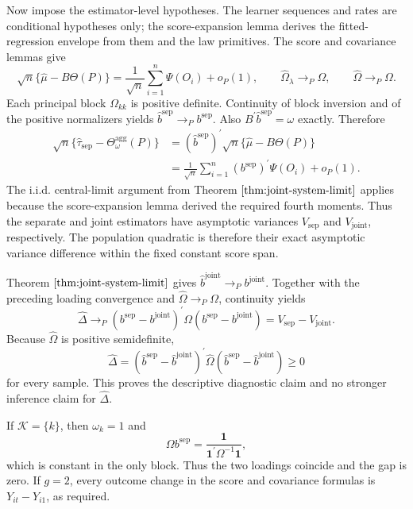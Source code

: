 Now impose the estimator-level hypotheses. The learner sequences and rates are conditional hypotheses only; the score-expansion lemma derives the fitted-regression envelope from them and the law primitives. The score and covariance lemmas give
\[
 \sqrt n\{\widehat\mu-B\Theta(P)\}
 =\frac1{\sqrt n}\sum_{i=1}^n\Psi(O_i)+o_P(1),
 \qquad
 \widehat\Omega_\lambda\to_P\Omega,
 \qquad
 \widehat\Omega\to_P\Omega.
\]
Each principal block \(\Omega_{kk}\) is positive definite. Continuity of block inversion and of the positive normalizers yields \(\widehat b^{\mathrm{sep}}\to_Pb^{\mathrm{sep}}\). Also \(B^{\prime}\widehat b^{\mathrm{sep}}=\omega\) exactly. Therefore
\[
\begin{aligned}
 \sqrt n\{\widehat\tau_{\mathrm{sep}}-\Theta_\omega^{\mathrm{agg}}(P)\}
 &=(\widehat b^{\mathrm{sep}})^{\prime}
   \sqrt n\{\widehat\mu-B\Theta(P)\}\\
 &=\frac1{\sqrt n}\sum_{i=1}^n
   (b^{\mathrm{sep}})^{\prime}\Psi(O_i)+o_P(1).
\end{aligned}
\]
The i.i.d. central-limit argument from Theorem \(\ref{thm:joint-system-limit}\) applies because the score-expansion lemma derived the required fourth moments. Thus the separate and joint estimators have asymptotic variances \(V_{\mathrm{sep}}\) and \(V_{\mathrm{joint}}\), respectively. The population quadratic is therefore their exact asymptotic variance difference within the fixed constant score span.

Theorem \(\ref{thm:joint-system-limit}\) gives \(\widehat b^{\mathrm{joint}}\to_Pb^{\mathrm{joint}}\). Together with the preceding loading convergence and \(\widehat\Omega\to_P\Omega\), continuity yields
\[
 \widehat\Delta
 \to_P
 (b^{\mathrm{sep}}-b^{\mathrm{joint}})^{\prime}
 \Omega(b^{\mathrm{sep}}-b^{\mathrm{joint}})
 =V_{\mathrm{sep}}-V_{\mathrm{joint}}.
\]
Because \(\widehat\Omega\) is positive semidefinite,
\[
 \widehat\Delta
 =(\widehat b^{\mathrm{sep}}-\widehat b^{\mathrm{joint}})^{\prime}
 \widehat\Omega
 (\widehat b^{\mathrm{sep}}-\widehat b^{\mathrm{joint}})\ge0
\]
for every sample. This proves the descriptive diagnostic claim and no stronger inference claim for \(\widehat\Delta\).

If \(\mathcal K=\{k\}\), then \(\omega_k=1\) and
\[
 \Omega b^{\mathrm{sep}}
 =\frac{\mathbf 1}{\mathbf 1^{\prime}\Omega^{-1}\mathbf 1},
\]
which is constant in the only block. Thus the two loadings coincide and the gap is zero. If \(g=2\), every outcome change in the score and covariance formulas is \(Y_{it}-Y_{i1}\), as required.